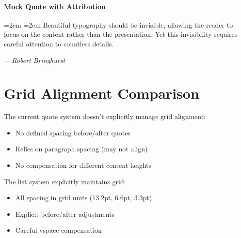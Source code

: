 \documentclass[11pt]{article}
\begin{document}
\paragraph{Mock Quote with Attribution}
\begingroup
\par\vspace{6.6pt}%
\leftskip=2em \rightskip=2em
\small \linespread{1.09}\selectfont \color{subtlegray}
\noindent
Beautiful typography should be invisible, allowing the reader to focus on the content rather than the presentation. Yet this invisibility requires careful attention to countless details.
\par\vspace{3.3pt}%
\hfill---\,\textit{Robert Bringhurst}
\par\vspace{6.6pt}%
\endgroup

\section{Grid Alignment Comparison}

The current quote system doesn't explicitly manage grid alignment:

\begin{itemize}
\item No defined spacing before/after quotes
\item Relies on paragraph spacing (may not align)
\item No compensation for different content heights
\end{itemize}

The list system explicitly maintains grid:

\begin{itemize}
\item All spacing in grid units (13.2pt, 6.6pt, 3.3pt)
\item Explicit before/after adjustments
\item Careful vspace compensation
\end{itemize}
\end{document}
